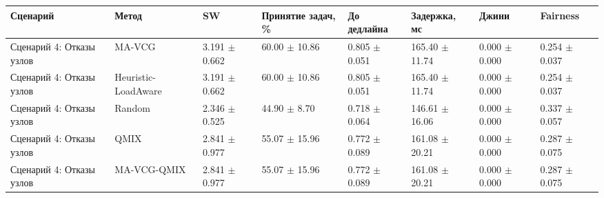 \begin{tabular}{llllllll}
\toprule
Сценарий & Метод & SW & Принятие задач, \% & До дедлайна & Задержка, мс & Джини & Fairness \\
\midrule
Сценарий 4: Отказы узлов & MA-VCG & 3.191 $\pm$ 0.662 & 60.00 $\pm$ 10.86 & 0.805 $\pm$ 0.051 & 165.40 $\pm$ 11.74 & 0.000 $\pm$ 0.000 & 0.254 $\pm$ 0.037 \\
Сценарий 4: Отказы узлов & Heuristic-LoadAware & 3.191 $\pm$ 0.662 & 60.00 $\pm$ 10.86 & 0.805 $\pm$ 0.051 & 165.40 $\pm$ 11.74 & 0.000 $\pm$ 0.000 & 0.254 $\pm$ 0.037 \\
Сценарий 4: Отказы узлов & Random & 2.346 $\pm$ 0.525 & 44.90 $\pm$ 8.70 & 0.718 $\pm$ 0.064 & 146.61 $\pm$ 16.06 & 0.000 $\pm$ 0.000 & 0.337 $\pm$ 0.057 \\
Сценарий 4: Отказы узлов & QMIX & 2.841 $\pm$ 0.977 & 55.07 $\pm$ 15.96 & 0.772 $\pm$ 0.089 & 161.08 $\pm$ 20.21 & 0.000 $\pm$ 0.000 & 0.287 $\pm$ 0.075 \\
Сценарий 4: Отказы узлов & MA-VCG-QMIX & 2.841 $\pm$ 0.977 & 55.07 $\pm$ 15.96 & 0.772 $\pm$ 0.089 & 161.08 $\pm$ 20.21 & 0.000 $\pm$ 0.000 & 0.287 $\pm$ 0.075 \\
\bottomrule
\end{tabular}
